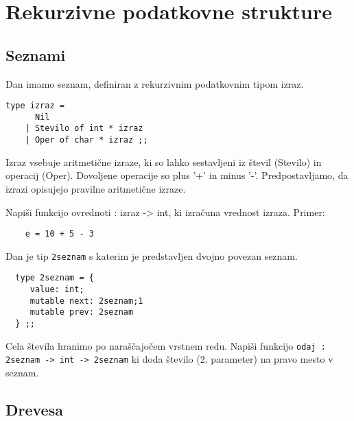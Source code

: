 
\section{Rekurzivne podatkovne strukture}

\subsection{Seznami}
\begin{ex}
Dan imamo seznam, definiran z rekurzivnim podatkovnim tipom izraz. 
\begin{lstlisting}
type izraz = 
      Nil 
    | Stevilo of int * izraz 
    | Oper of char * izraz ;; 
\end{lstlisting}
Izraz vsebuje aritmeti\v cne izraze, ki so lahko sestavljeni iz \v stevil (Stevilo) in operacij (Oper). Dovoljene operacije so plus '+' in minus '-'. Predpostavljamo, da izrazi opisujejo pravilne aritmeti\v cne izraze.

Napi\v si funkcijo ovrednoti : izraz -> int, ki izra\v cuna vrednost izraza.
Primer: 
\begin{lstlisting} 
    e = 10 + 5 - 3
\end{lstlisting}

\end{ex}
\begin{ex}
  Dan je tip \lstinline{2seznam} s katerim je predstavljen dvojno povezan
  seznam.

\begin{lstlisting}
  type 2seznam = {
     value: int;
     mutable next: 2seznam;1
     mutable prev: 2seznam
  } ;;
\end{lstlisting}

  Cela \v stevila hranimo po nara\v s\v cajo\v cem vrstnem
  redu. Napi\v si funkcijo \lstinline{odaj : 2seznam -> int -> 2seznam}
  ki doda \v stevilo (2. parameter) na pravo mesto v seznam.


\end{ex} 

\subsection{Drevesa}

